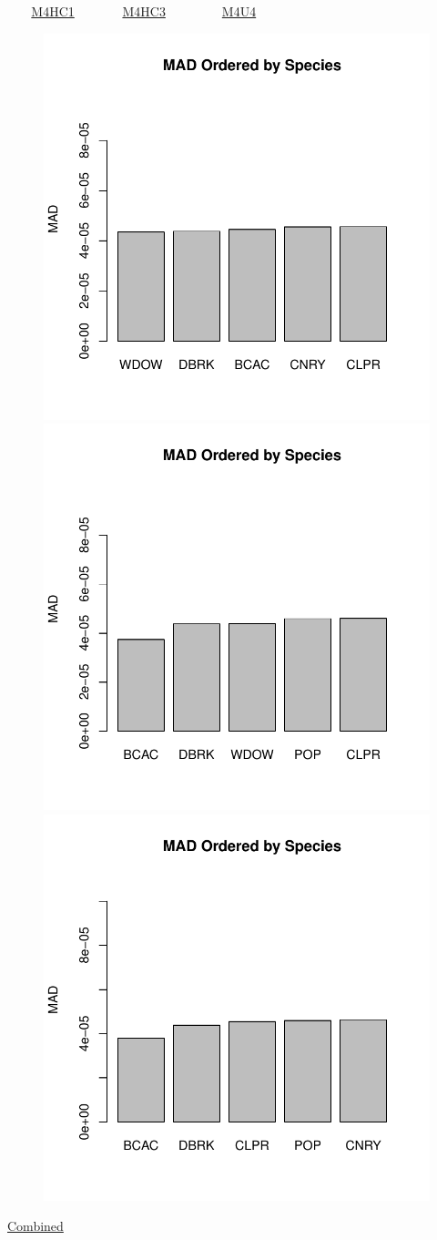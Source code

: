 \documentclass[ xcolor = pdftex, dvipsnames, table ]{beamer}
\begin{document}
%
\begin{frame}{$~~~~~~~$ \href{https://github.com/gasduster99/sppComp/tree/master/sscRuns/25019781982M4HC1}{M4HC1} $~~~~~~~~~~~~~~$ \href{https://github.com/gasduster99/sppComp/tree/master/sscRuns/25019781982M4HC3}{M4HC3} $~~~~~~~~~~~~~~~~~$ \href{https://github.com/gasduster99/sppComp/tree/master/sscRuns/25019781982M4U4}{M4U4} }
        \begin{figure}[ht!]
        \centering
        \hspace*{-1cm}
        \includegraphics[width=.4\textwidth]{../sscRuns/25019781982M4HC1/sppHeadMad68.pdf}
        \includegraphics[width=.4\textwidth]{../sscRuns/25019781982M4HC3/sppHeadMad68.pdf}
        \includegraphics[width=.4\textwidth]{../sscRuns/25019781982M4U4/sppHeadMad68.pdf}
        \end{figure}
	\vspace{-1cm}
	\begin{center}
	\Large
	\href{https://github.com/gasduster99/sppComp/tree/master/try1/postSSC/25019781982M4HC1HC3U4}{Combined}
	\end{center}
\end{frame}
\end{document}
